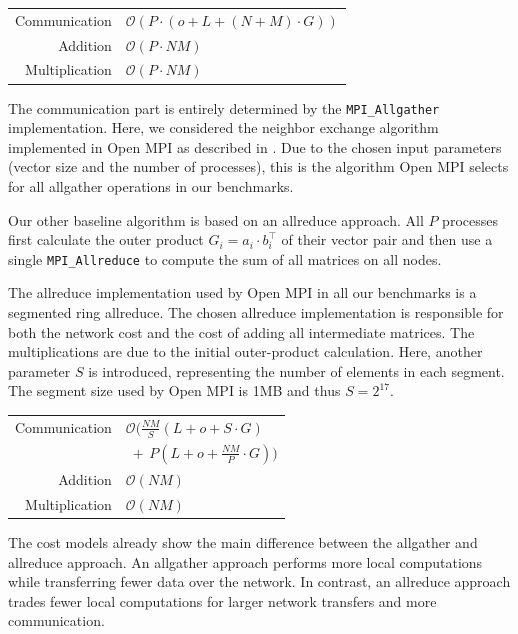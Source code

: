 \documentclass[letterpaper]{article}
\begin{document}
\begin{tabular}{r l}
    Communication   &   $\mathcal{O}\left(P \cdot \left(o + L + (N + M) \cdot G \right)\right)$ \\
    Addition        &   $\mathcal{O}(P\cdot NM)$ \\
    Multiplication  &   $\mathcal{O}(P\cdot NM)$
\end{tabular}

The communication part is entirely determined by the \verb|MPI_Allgather| implementation. Here, we considered the neighbor exchange algorithm implemented in Open MPI as described in \cite{Chen:05}. Due to the chosen input parameters (vector size and the number of processes), this is the algorithm Open MPI selects for all allgather operations in our benchmarks. \cite{openMPI_decision_tree_4_0_2}

Our other baseline algorithm is based on an allreduce approach. All $P$ processes first calculate the outer product $G_i = a_i \cdot b_{i}^{\top}$ of their vector pair and then use a single \verb|MPI_Allreduce| to compute the sum of all matrices on all nodes.

The allreduce implementation used by Open MPI in all our benchmarks is a segmented ring allreduce. The chosen allreduce implementation is responsible for both the network cost and the cost of adding all intermediate matrices. The multiplications are due to the initial outer-product calculation. Here, another parameter $S$ is introduced, representing the number of elements in each segment. The segment size used by Open MPI is 1MB and thus $S = 2^{17}$. \cite{openMPI_decision_tree_4_0_2}

\begin{tabular}{r l}
    Communication   &   $\mathcal{O}\big(\frac{NM}{S}\left(L + o + S \cdot G \right)$ \\
                    &   $\; + \, P \left(L + o + \frac{NM}{P}\cdot G \right)\big)$ \\
    Addition        &   $\mathcal{O}(NM)$ \\
    Multiplication  &   $\mathcal{O}(NM)$
\end{tabular}

The cost models already show the main difference between the allgather and allreduce approach. An allgather approach performs more local computations while transferring fewer data over the network. In contrast, an allreduce approach trades fewer local computations for larger network transfers and more communication.\\[-23pt]
\end{document}
